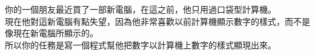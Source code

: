 你的一個朋友最近買了一部新電腦，在這之前，他只用過口袋型計算機。\\
現在他對這新電腦有點失望，因為他非常喜歡以前計算機顯示數字的樣式，而不是像現在新電腦所顯示的。\\
所以你的任務是寫一個程式幫他把數字以計算機上數字的樣式顯現出來。\\
